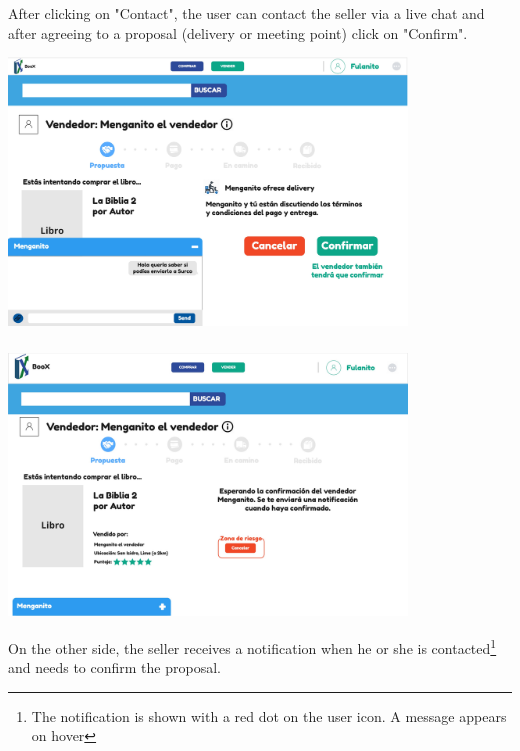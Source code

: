 After clicking on "Contact", the user can contact the seller via a live chat and after agreeing to a proposal (delivery or meeting point) click on "Confirm".\\

\begin{center}
    \includegraphics[width=300pt]{img/mockups/Huascar Retrieval Team - Copy of Contactar vendedor - Propuesta.jpg}
    \end{center}
    \subsubsection*{}
    \begin{center}
    \includegraphics[width=300pt]{img/mockups/Huascar Retrieval Team - Copy of Contactar vendedor - Propuesta (1).jpg}
\end{center}


On the other side, the seller receives a notification when he or she is contacted\footnote{The notification is shown with a red dot on the user icon. A message appears on hover} and needs to confirm the proposal.\\

